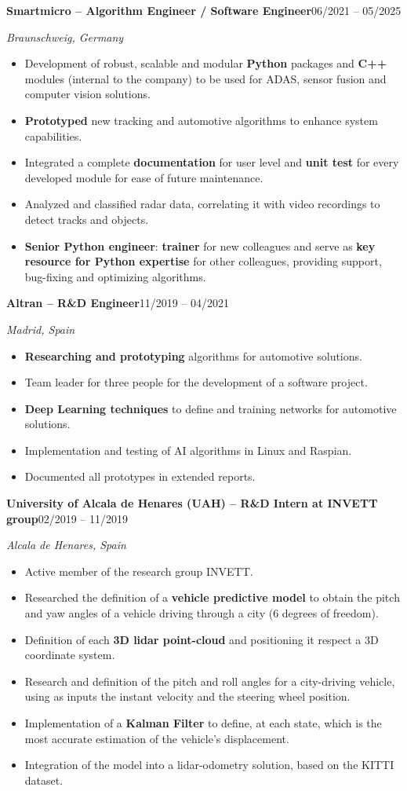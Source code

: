 \documentclass[10pt,a4paper]{article}
\newcommand{\entry}[3]{%
  \vspace{0.7em}%
  \textbf{#2}\hfill #1\par
  \textit{#3}\par\vspace{0.1em}}
\begin{document}
\entry{06/2021 -- 05/2025}{Smartmicro -- Algorithm Engineer / Software Engineer}{Braunschweig, Germany}
\begin{itemize}
  \item Development of robust, scalable and modular \textbf{Python} packages and \textbf{C++} modules (internal to the company) to be used for ADAS, sensor fusion and computer vision solutions.
  \item \textbf{Prototyped} new tracking and automotive algorithms to enhance system capabilities.
  \item Integrated a complete \textbf{documentation} for user level and \textbf{unit test} for every developed module for ease of future maintenance.
  \item Analyzed and classified radar data, correlating it with video recordings to detect tracks and objects.
  \item \textbf{Senior Python engineer}: \textbf{trainer} for new colleagues and serve as \textbf{key resource for Python expertise} for other colleagues, providing support, bug-fixing and optimizing algorithms.
\end{itemize}

\entry{11/2019 -- 04/2021}{Altran -- R\&D Engineer}{Madrid, Spain}
\begin{itemize}
  \item \textbf{Researching and prototyping} algorithms for automotive solutions.
  \item Team leader for three people for the development of a software project.
  \item \textbf{Deep Learning techniques} to define and training networks for automotive solutions.
  \item Implementation and testing of AI algorithms in Linux and Raspian.
  \item Documented all prototypes in extended reports.
\end{itemize}

\entry{02/2019 -- 11/2019}{University of Alcala de Henares (UAH) -- R\&D Intern at INVETT group}{Alcala de Henares, Spain}
\begin{itemize}
  \item Active member of the research group INVETT.
  \item Researched the definition of a \textbf{vehicle predictive model} to obtain the pitch and yaw angles of a vehicle driving through a city (6 degrees of freedom).
  \item Definition of each \textbf{3D lidar point-cloud} and positioning it respect a 3D coordinate system.
  \item Research and definition of the pitch and roll angles for a city-driving vehicle, using as inputs the instant velocity and the steering wheel position.
  \item Implementation of a \textbf{Kalman Filter} to define, at each state, which is the most accurate estimation of the vehicle's displacement.
  \item Integration of the model into a lidar-odometry solution, based on the KITTI dataset.
\end{itemize}
\end{document}
